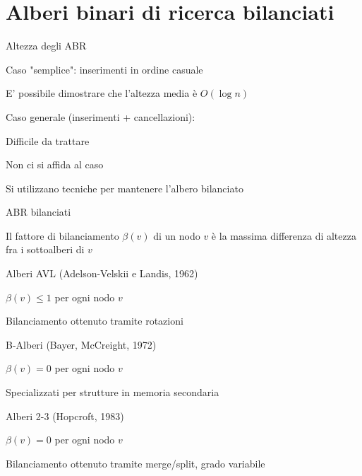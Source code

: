 \section{Alberi binari di ricerca bilanciati}

\begin{frame}{Altezza degli ABR}

\BIL
\item Caso "semplice": inserimenti in ordine casuale
  \BI
  \item E' possibile dimostrare che l'altezza media è $O(\log n)$
  \EI
\item Caso generale (inserimenti + cancellazioni): 
  \BI
  \item Difficile da trattare
  \EI
\EIL

\BIL
\item Non ci si affida al caso
\item Si utilizzano tecniche per mantenere l'albero bilanciato
\EIL

\end{frame}

\begin{frame}{ABR bilanciati}

\vspace{-9pt}
\begin{myboxtitle}
Il \alert{fattore di bilanciamento} $\beta(v)$ di un nodo $v$ è la massima differenza di altezza fra i sottoalberi di $v$
\end{myboxtitle}

\BIL
\item \alert{Alberi AVL} (Adelson-Velskii e Landis, 1962)
\BI
\item $\beta(v) \leq 1$  per ogni nodo $v$
\item Bilanciamento ottenuto tramite rotazioni
\EI
\item \alert{B-Alberi} (Bayer, McCreight,  1972)
\BI
\item $\beta(v) = 0$ per ogni nodo $v$
\item  Specializzati per strutture in memoria secondaria
\EI
\item \alert{Alberi 2-3} (Hopcroft, 1983)
\BI
\item  $\beta(v) = 0$ per ogni nodo $v$
\item Bilanciamento ottenuto tramite merge/split, grado variabile
\EI
\EIL

\end{frame}

